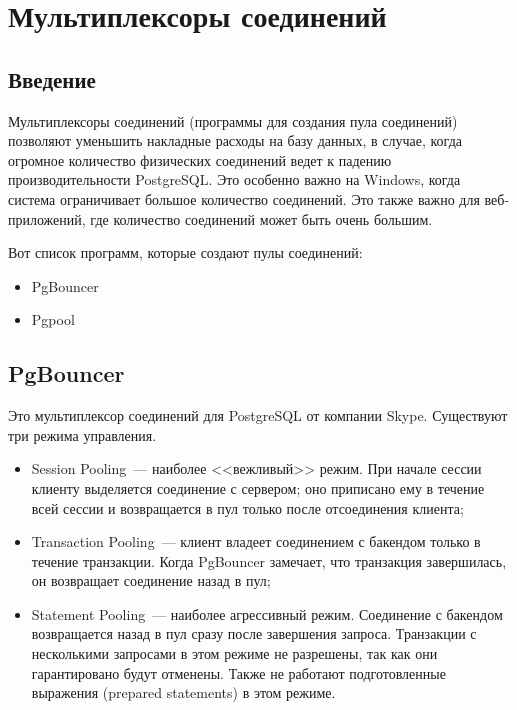 \chapter{Мультиплексоры соединений}

\begin{epigraphs}
\end{epigraphs}

\section{Введение}

Мультиплексоры соединений (программы для создания пула соединений) позволяют уменьшить накладные расходы на базу данных, в случае, когда огромное количество физических соединений ведет к падению производительности PostgreSQL. Это особенно важно на Windows, когда система ограничивает большое количество соединений. Это также важно для веб-приложений, где количество соединений может быть очень большим.

Вот список программ, которые создают пулы соединений:

\begin{itemize}
  \item PgBouncer
  \item Pgpool
\end{itemize}

\section{PgBouncer}

Это мультиплексор соединений для PostgreSQL от компании Skype. Существуют три режима управления.

\begin{itemize}
  \item Session Pooling~--- наиболее <<вежливый>> режим. При начале сессии клиенту выделяется соединение с сервером; оно приписано ему в течение всей сессии и возвращается в пул только после отсоединения клиента;
  \item Transaction Pooling~--- клиент владеет соединением с бакендом только в течение транзакции. Когда PgBouncer замечает, что транзакция завершилась, он возвращает соединение назад в пул;
  \item Statement Pooling~--- наиболее агрессивный режим. Соединение с бакендом возвращается назад в пул сразу после завершения запроса. Транзакции с несколькими запросами в этом режиме не разрешены, так как они гарантировано будут отменены. Также не работают подготовленные выражения (prepared statements) в этом режиме.
\end{itemize}

